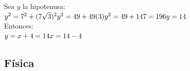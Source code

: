 \begin{enumerate}
	Sea $y$ la hipotenusa:\\
	$ y^2 = 7^2 + (7\sqrt{3})^2 \\
	 y^2 = 49 + 49(3) \\
	 y^2 = 49 + 147 = 196 \\
	 y = 14 $\\
	Entonces:\\
	$ y = x + 4 = 14 \\
	 x = 14 - 4 $\\
	
	\vspace{6mm}
	
\end{enumerate}






\subsection*{Física}

